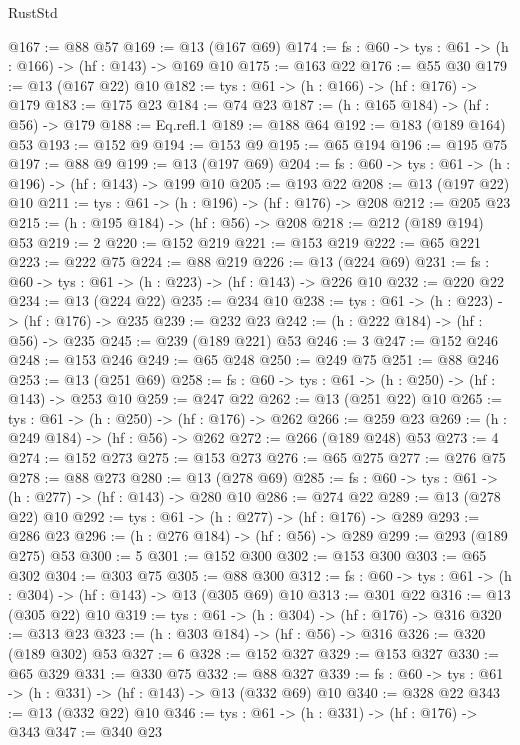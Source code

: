 \begin{lexlean}{RustStd}
\begin{coremodule}
@167 := @88 @57
@169 := @13 (@167 @69)
@174 := {fs : @60} -> {tys : @61} -> (h : @166) -> (hf : @143) -> @169 @10
@175 := @163 @22
@176 := @55 @30
@179 := @13 (@167 @22) @10
@182 := {tys : @61} -> (h : @166) -> (hf : @176) -> @179
@183 := @175 @23
@184 := @74 @23
@187 := (h : @165 @184) -> (hf : @56) -> @179
@188 := Eq.refl.{1}
@189 := @188 @64
@192 := @183 (@189 @164) @53
@193 := @152 @9
@194 := @153 @9
@195 := @65 @194
@196 := @195 @75
@197 := @88 @9
@199 := @13 (@197 @69)
@204 := {fs : @60} -> {tys : @61} -> (h : @196) -> (hf : @143) -> @199 @10
@205 := @193 @22
@208 := @13 (@197 @22) @10
@211 := {tys : @61} -> (h : @196) -> (hf : @176) -> @208
@212 := @205 @23
@215 := (h : @195 @184) -> (hf : @56) -> @208
@218 := @212 (@189 @194) @53
@219 := 2
@220 := @152 @219
@221 := @153 @219
@222 := @65 @221
@223 := @222 @75
@224 := @88 @219
@226 := @13 (@224 @69)
@231 := {fs : @60} -> {tys : @61} -> (h : @223) -> (hf : @143) -> @226 @10
@232 := @220 @22
@234 := @13 (@224 @22)
@235 := @234 @10
@238 := {tys : @61} -> (h : @223) -> (hf : @176) -> @235
@239 := @232 @23
@242 := (h : @222 @184) -> (hf : @56) -> @235
@245 := @239 (@189 @221) @53
@246 := 3
@247 := @152 @246
@248 := @153 @246
@249 := @65 @248
@250 := @249 @75
@251 := @88 @246
@253 := @13 (@251 @69)
@258 := {fs : @60} -> {tys : @61} -> (h : @250) -> (hf : @143) -> @253 @10
@259 := @247 @22
@262 := @13 (@251 @22) @10
@265 := {tys : @61} -> (h : @250) -> (hf : @176) -> @262
@266 := @259 @23
@269 := (h : @249 @184) -> (hf : @56) -> @262
@272 := @266 (@189 @248) @53
@273 := 4
@274 := @152 @273
@275 := @153 @273
@276 := @65 @275
@277 := @276 @75
@278 := @88 @273
@280 := @13 (@278 @69)
@285 := {fs : @60} -> {tys : @61} -> (h : @277) -> (hf : @143) -> @280 @10
@286 := @274 @22
@289 := @13 (@278 @22) @10
@292 := {tys : @61} -> (h : @277) -> (hf : @176) -> @289
@293 := @286 @23
@296 := (h : @276 @184) -> (hf : @56) -> @289
@299 := @293 (@189 @275) @53
@300 := 5
@301 := @152 @300
@302 := @153 @300
@303 := @65 @302
@304 := @303 @75
@305 := @88 @300
@312 := {fs : @60} -> {tys : @61} -> (h : @304) -> (hf : @143) -> @13 (@305 @69) @10
@313 := @301 @22
@316 := @13 (@305 @22) @10
@319 := {tys : @61} -> (h : @304) -> (hf : @176) -> @316
@320 := @313 @23
@323 := (h : @303 @184) -> (hf : @56) -> @316
@326 := @320 (@189 @302) @53
@327 := 6
@328 := @152 @327
@329 := @153 @327
@330 := @65 @329
@331 := @330 @75
@332 := @88 @327
@339 := {fs : @60} -> {tys : @61} -> (h : @331) -> (hf : @143) -> @13 (@332 @69) @10
@340 := @328 @22
@343 := @13 (@332 @22) @10
@346 := {tys : @61} -> (h : @331) -> (hf : @176) -> @343
@347 := @340 @23

\end{coremodule}
\end{lexlean}
